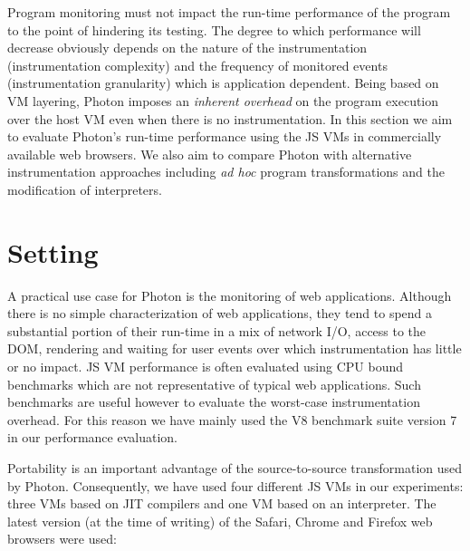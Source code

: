 Program monitoring must not impact the run-time performance of
the program to the point of hindering its testing.  The degree to
which performance will decrease obviously depends on the nature of the
instrumentation (instrumentation complexity) and the frequency of
monitored events (instrumentation granularity) which is application
dependent.  Being based on VM layering, Photon imposes an {\it
  inherent overhead} on the program execution over the host VM even
when there is no instrumentation.  In this section we aim to evaluate
Photon's run-time performance using the JS VMs in commercially
available web browsers.  We also aim to compare Photon with alternative
instrumentation approaches including \textit{ad hoc} program transformations
and the modification of interpreters.

\section{Setting}

A practical use case for Photon is the monitoring of web
applications.  Although there is no simple characterization of web
applications, they tend to spend a substantial portion of their run-time
in a mix of network I/O, access to the DOM, rendering and waiting for
user events over which instrumentation has little or no impact.
JS VM performance is often evaluated using CPU bound
benchmarks which are not representative of typical web applications.
Such benchmarks are useful however to evaluate the worst-case
instrumentation overhead.  For this reason we have mainly used the V8
benchmark suite version 7 in our performance evaluation.

Portability is an important advantage of the source-to-source
transformation used by Photon.  Consequently, we have used four
different JS VMs in our experiments: three VMs based on JIT
compilers and one VM based on an interpreter.  The latest version (at
the time of writing) of the Safari, Chrome and Firefox web browsers
were used:

